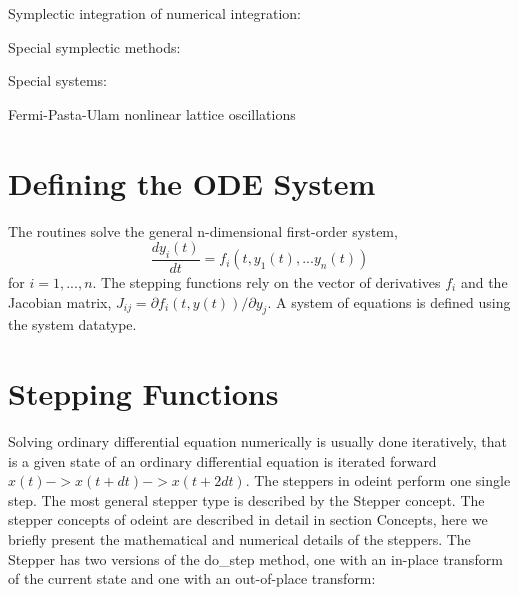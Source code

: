 \cite{Hairer_2009}

\cite{Hairer_2010}



Symplectic integration of numerical integration: 

\cite{Hairer_2006}

\cite{Leimkuhler_2005}



Special symplectic methods: 

\cite{Yoshida_1990}


\cite{McLachlan_1995}




Special systems: 

Fermi-Pasta-Ulam nonlinear lattice oscillations %

\cite{Pikovsky_2001}



\section{Defining the ODE System}
\label{IntroductionODE}

The routines solve the general n-dimensional first-order system,
\begin{equation}
\frac{dy_i(t)}{dt} = f_i(t, y_1(t), . . . y_n(t))
\end{equation}
for $i = 1, . . . , n$. The stepping functions rely on the vector of derivatives $f_i$ and the Jacobian
matrix, $J_{ij} =\partial f_i(t, y(t))/\partial y_j$. A system of equations is defined using the 
system datatype.

\section{Stepping Functions}
\label{SteppingFunctionsODE}

Solving ordinary differential equation numerically is usually done iteratively, that is a given state of an ordinary differential equation is iterated forward $x(t) -> x(t+dt) -> x(t+2dt)$. The steppers in odeint perform one single step. The most general stepper type is described by the Stepper concept. The stepper concepts of odeint are described in detail in section Concepts, here we briefly present the mathematical and numerical details of the steppers. The Stepper has two versions of the do\_step method, one with an in-place transform of the current state and one with an out-of-place transform: 


